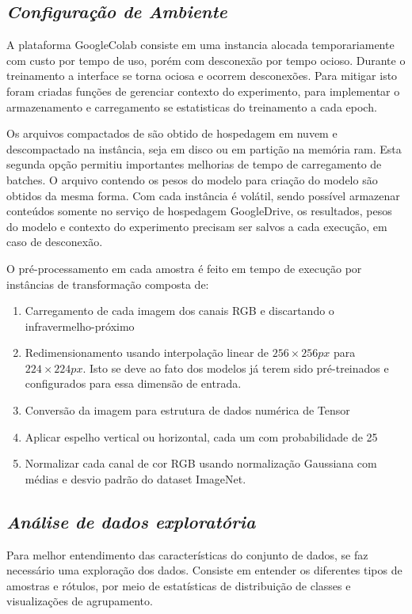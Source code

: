 \subsection{\textit{Configuração de Ambiente}}\label{sec:Cap3_ConfigAmbiente}

A plataforma GoogleColab consiste em uma instancia alocada temporariamente com custo por tempo de uso, porém com desconexão por tempo ocioso. Durante o treinamento a interface se torna ociosa e ocorrem desconexões. Para mitigar isto foram criadas funções de gerenciar contexto do experimento, para implementar o armazenamento e carregamento se estatisticas do treinamento a cada epoch.

Os arquivos compactados de são obtido de hospedagem em nuvem e descompactado na instância, seja em disco ou em partição na memória ram. Esta segunda opção permitiu importantes melhorias de tempo de carregamento de batches. O arquivo contendo os pesos do modelo para criação do modelo são obtidos da mesma forma. Com cada instância é volátil, sendo possível armazenar conteúdos somente no serviço de hospedagem GoogleDrive, os resultados, pesos do modelo e contexto do experimento precisam ser salvos a cada execução, em caso de desconexão.


O pré-processamento em cada amostra é feito em tempo de execução por instâncias de transformação composta de:
\begin{enumerate}
    \item   Carregamento de cada imagem dos canais RGB e discartando o infravermelho-próximo
    \item   Redimensionamento usando interpolação linear de $256 \times 256px$ para $224 \times 224px$. Isto se deve ao fato dos modelos já terem sido pré-treinados e configurados para essa dimensão de entrada.
    \item   Conversão da imagem para estrutura de dados numérica de Tensor
    \item   Aplicar espelho vertical ou horizontal, cada um com probabilidade de 25%
    \item   Normalizar cada canal de cor RGB usando normalização Gaussiana com médias e desvio padrão do dataset ImageNet.
\end{enumerate}



\subsection{\textit{Análise de dados exploratória}}\label{sec:Cap3_AnaliseDeDadosExploratoria}
Para melhor entendimento das características do conjunto de dados, se faz necessário uma exploração dos dados. Consiste em entender os diferentes tipos de amostras e rótulos, por meio de estatísticas de distribuição de classes e visualizações de agrupamento.



